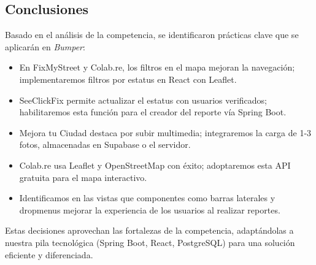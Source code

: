 \subsection*{Conclusiones}

Basado en el análisis de la competencia, se identificaron prácticas clave que se aplicarán en \textit{Bumper}:

\begin{itemize}
    \item En FixMyStreet y Colab.re, los filtros en el mapa mejoran la navegación; implementaremos filtros por estatus en React con Leaflet.
    \item SeeClickFix permite actualizar el estatus con usuarios verificados; habilitaremos esta función para el creador del reporte vía Spring Boot.
    \item Mejora tu Ciudad destaca por subir multimedia; integraremos la carga de 1-3 fotos, almacenadas en Supabase o el servidor.
    \item Colab.re usa Leaflet y OpenStreetMap con éxito; adoptaremos esta API gratuita para el mapa interactivo.
    \item Identificamos en las vistas que componentes como barras laterales y dropmenus mejorar la experiencia de los usuarios al realizar reportes.
\end{itemize}

Estas decisiones aprovechan las fortalezas de la competencia, adaptándolas a nuestra pila tecnológica (Spring Boot, React, PostgreSQL) para una solución eficiente y diferenciada.